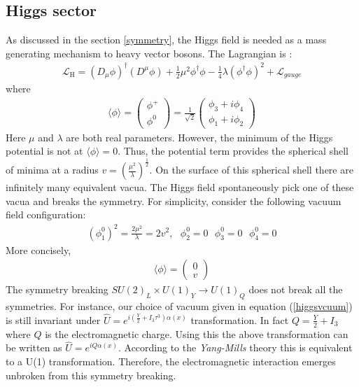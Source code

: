 \subsection{Higgs sector}\label{higgssec}
As discussed in the section \ref{symmetry}, the Higgs field is needed as a mass generating mechanism to heavy vector bosons. The Lagrangian is \cite{Manohar:2000dt, Lancaster:2014pza, LlewellynSmith:1973yud}: 
\begin{eqnarray}\label{higgsLagrangian}
\mathcal{L}_{\mathrm{H}}=\left(D_{\mu} \phi\right)^{\dagger}\left(D^{\mu} \phi\right)+\frac{1}{2}\mu^{2} \phi^{\dagger} \phi-\frac{1}{4}\lambda\left(\phi^{\dagger} \phi\right)^{2}+\mathcal{L}_{gauge}
\end{eqnarray}
where 
\begin{eqnarray}
\langle\phi\rangle=\left(\begin{array}{l}{\phi^+} \\ {\phi^0}\end{array}\right)=\frac{1}{\sqrt{2}}\left(\begin{array}{l}{\phi_3+i\phi_4} \\ {\phi_1+i\phi_2}\end{array}\right)
\end{eqnarray}
Here $\mu$ and $\lambda$ are both real parameters. However, the minimum of the Higgs potential is not at $\langle\phi\rangle=0$. Thus, the  potential term provides the spherical shell of minima at a radius $v=\left(\frac{\mu^2}{\lambda}\right)^{\frac{1}{2}}$. On the surface of this spherical shell there are infinitely many equivalent vacua. The Higgs field spontaneously pick one of these vacua and breaks the symmetry. For simplicity, consider the following vacuum field configuration:
\begin{eqnarray}
(\phi_1^0)^2=\frac{2\mu^2}{\lambda}=2 v^2, \text{  } \phi_2^0=0\text{  }\phi_3^0=0\text{  }\phi_4^0=0
\end{eqnarray}
More concisely, 
\begin{eqnarray}\label{higgsvcuum}
\langle\phi\rangle=\left(\begin{array}{l}{0} \\ {v}\end{array}\right)
\end{eqnarray}
The symmetry breaking $SU(2)_L\times U(1)_Y\rightarrow U(1)_Q$ does not break all the symmetries. For instance, our choice of vacuum given in equation (\ref{higgsvcuum}) is still invariant under $\hat{U}=e^{i(\frac{Y}{2}+I_3\tau^3)\alpha(x)}$ transformation. In fact $Q=\frac{Y}{2}+I_3$ where $Q$ is the electromagnetic charge. Using this the above transformation can be written as  $\hat{U}=e^{iQ\alpha(x)}$. According to the \textit{Yang-Mills} theory this is equivalent to a U(1) transformation. Therefore, the electromagnetic interaction emerges unbroken from this symmetry breaking. \par
